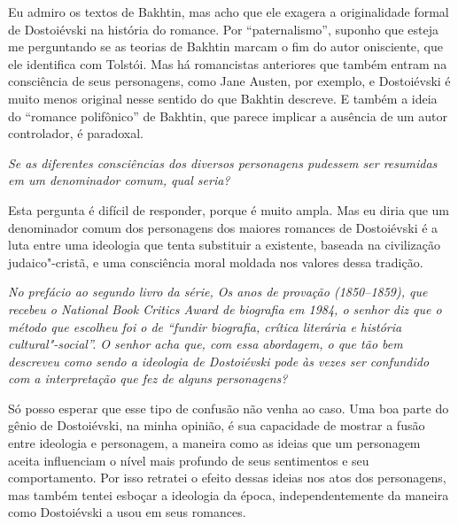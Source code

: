Eu admiro os textos de Bakhtin, mas acho que ele exagera a originalidade
formal de Dostoiévski na história do romance. Por ``paternalismo'',
suponho que esteja me perguntando se as teorias de Bakhtin marcam o fim
do autor onisciente, que ele identifica com Tolstói. Mas há romancistas
anteriores que também entram na consciência de seus personagens, como
Jane Austen, por exemplo, e Dostoiévski é muito menos original nesse
sentido do que Bakhtin descreve. E também a ideia do ``romance polifônico''
de Bakhtin, que parece implicar a ausência de um autor controlador, é
paradoxal.

\medskip

\emph{Se as diferentes consciências dos diversos personagens pudessem ser
resumidas em um denominador comum, qual seria?}

Esta pergunta é difícil de responder, porque é muito ampla. Mas eu diria
que um denominador comum dos personagens dos maiores romances de
Dostoiévski é a luta entre uma ideologia que tenta substituir a
existente, baseada na civilização judaico"-cristã, e uma consciência
moral moldada nos valores dessa tradição.

\medskip

\emph{No prefácio ao segundo livro da série, \emph{Os anos de provação (1850--1859)}, que recebeu o \emph{National Book Critics Award} de biografia em 1984, o
senhor diz que o método que escolheu foi o de ``fundir biografia, crítica
literária e história cultural"-social''. O senhor acha que, com essa
abordagem, o que tão bem descreveu como sendo a ideologia de
Dostoiévski pode às vezes ser confundido com a interpretação que
fez de alguns personagens?}

Só posso esperar que esse tipo de confusão não venha ao caso.
Uma boa parte do gênio de Dostoiévski, na minha opinião, é sua
capacidade de mostrar a fusão entre ideologia e personagem, a maneira
como as ideias que um personagem aceita influenciam o nível mais
profundo de seus sentimentos e seu comportamento. Por isso retratei o
efeito dessas ideias nos atos dos personagens, mas também tentei esboçar
a ideologia da época, independentemente da maneira como Dostoiévski a
usou em seus romances.

\medskip

